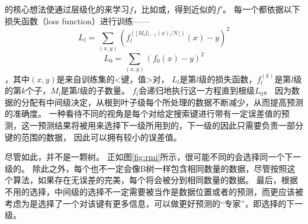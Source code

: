 {\rmi}的核心想法使通过层级化的{\model}来学习{\cdf}$f$，比如{\lr}或{\nn}，得到近似的{\cdf}$f'$。
每一个{\model}都依据以下损失函数（loss function）进行训练{------}
\[ L_l=\sum_{(x,y)}(f_l^{(\lfloor M_lf_{l-1}(x)/N\rfloor )}(x)-y)^2 \]
\[ L_0=\sum_{(x,y)}(f_0(x)-y)^2 \]
，其中$(x,y)$是来自训练集的<键，{\cdf}值>对，
$L_l$是第$l$级的损失函数，$f_l^{(k)}$是第$l$级的第$k$个子{\model}，$M_l$是第$l$级的子{\model}数量。
$f_l$会递归地执行这一方程直到根级$L_0$。
因为数据的分配有中间级{\model}决定，从根到叶子级每个{\model}所处理的数据不断减少，从而提高{\model}预测的准确度。
一种看待不同{\model}的视角是每个{\model}对给定搜索键进行带有一定误差值的预测，这一预测结果将被用来选择下一级所用到的{\model}，下一级的{\model}因此只需要负责一部分键的范围的数据，
因此可以拥有较小的误差值。


尽管如此，{\rmi}并不是一颗树。
正如图\ref{fig:rmi}所示，很可能不同的{\model}会选择同一个下一级的{\model}。
除此之外，每个{\model}也不一定会像B树一样包含相同数量的数据，尽管按照这个算法，如果存在无误差的完美{\model}，每个{\model}将会被分到相同数量的数据。
最后，根据不用的{\model}选择，中间级的选择不一定需要被当作是数据位置或者{\cdf}的预测，而更应该被考虑为是选择了一个对该键有更多信息，可以做更好预测的``专家''，即选择的下一级{\model}。

